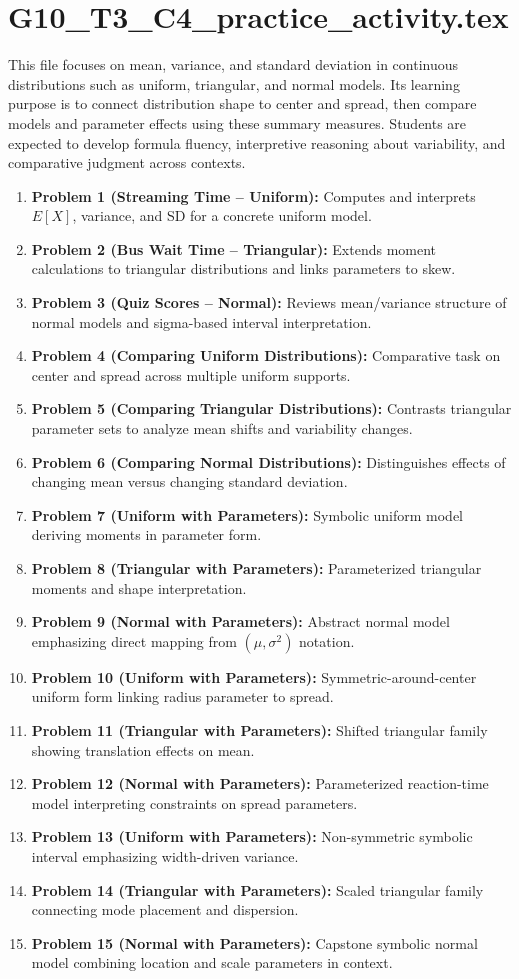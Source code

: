 \section{G10\_T3\_C4\_practice\_activity.tex}
This file focuses on mean, variance, and standard deviation in continuous distributions such as uniform, triangular, and normal models. Its learning purpose is to connect distribution shape to center and spread, then compare models and parameter effects using these summary measures. Students are expected to develop formula fluency, interpretive reasoning about variability, and comparative judgment across contexts.

\begin{enumerate}
  \item \textbf{Problem 1 (Streaming Time -- Uniform):} Computes and interprets \(E[X]\), variance, and SD for a concrete uniform model.
  \item \textbf{Problem 2 (Bus Wait Time -- Triangular):} Extends moment calculations to triangular distributions and links parameters to skew.
  \item \textbf{Problem 3 (Quiz Scores -- Normal):} Reviews mean/variance structure of normal models and sigma-based interval interpretation.
  \item \textbf{Problem 4 (Comparing Uniform Distributions):} Comparative task on center and spread across multiple uniform supports.
  \item \textbf{Problem 5 (Comparing Triangular Distributions):} Contrasts triangular parameter sets to analyze mean shifts and variability changes.
  \item \textbf{Problem 6 (Comparing Normal Distributions):} Distinguishes effects of changing mean versus changing standard deviation.
  \item \textbf{Problem 7 (Uniform with Parameters):} Symbolic uniform model deriving moments in parameter form.
  \item \textbf{Problem 8 (Triangular with Parameters):} Parameterized triangular moments and shape interpretation.
  \item \textbf{Problem 9 (Normal with Parameters):} Abstract normal model emphasizing direct mapping from \((\mu,\sigma^2)\) notation.
  \item \textbf{Problem 10 (Uniform with Parameters):} Symmetric-around-center uniform form linking radius parameter to spread.
  \item \textbf{Problem 11 (Triangular with Parameters):} Shifted triangular family showing translation effects on mean.
  \item \textbf{Problem 12 (Normal with Parameters):} Parameterized reaction-time model interpreting constraints on spread parameters.
  \item \textbf{Problem 13 (Uniform with Parameters):} Non-symmetric symbolic interval emphasizing width-driven variance.
  \item \textbf{Problem 14 (Triangular with Parameters):} Scaled triangular family connecting mode placement and dispersion.
  \item \textbf{Problem 15 (Normal with Parameters):} Capstone symbolic normal model combining location and scale parameters in context.
\end{enumerate}

